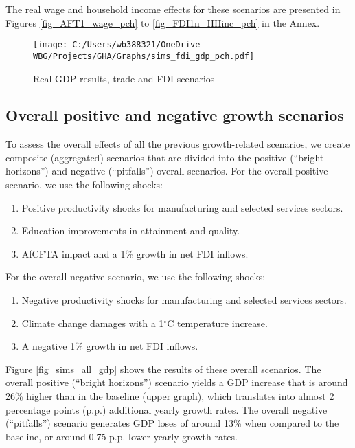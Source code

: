 \documentclass[11pt,english]{article}
\begin{document}
The real wage and household income effects for these scenarios are presented in Figures \ref{fig_AFT1_wage_pch} to \ref{fig_FDI1n_HHinc_pch} in the Annex.

\begin{figure}[ht!]\caption{Real GDP results, trade and FDI scenarios}\label{fig_sims_fdi_gdp_pch}
	\centering
	\texttt{[image: C:/Users/wb388321/OneDrive - WBG/Projects/GHA/Graphs/sims\_fdi\_gdp\_pch.pdf]}
\end{figure}


\clearpage


\subsection{Overall positive and negative growth scenarios}

To assess the overall effects of all the previous growth-related scenarios, we create composite (aggregated) scenarios that are divided into the positive (``bright horizons'') and negative (``pitfalls'') overall scenarios. For the overall positive scenario, we use the following shocks:
	\begin{enumerate}
		\item Positive productivity shocks for manufacturing and selected services sectors.
		\item Education improvements in attainment  and quality.
		\item AfCFTA impact and a 1\% growth in net FDI inflows.
	\end{enumerate}
\bigskip
For the overall negative scenario, we use the following shocks:
	\begin{enumerate}
		\item Negative productivity shocks for manufacturing and selected services sectors.
		\item Climate change damages with a 1$^{\circ}$C temperature increase.
		\item A negative 1\% growth in net FDI inflows.
	\end{enumerate}

Figure \ref{fig_sims_all_gdp} shows the results of these overall scenarios. The overall positive (``bright horizons'') scenario yields a GDP increase that is around 26\% higher than in the baseline (upper graph), which translates into almost 2 percentage points (p.p.) additional yearly growth rates. The overall negative (``pitfalls'') scenario generates GDP loses of around 13\% when compared to the baseline, or around 0.75 p.p. lower yearly growth rates. 
 
\end{document}
